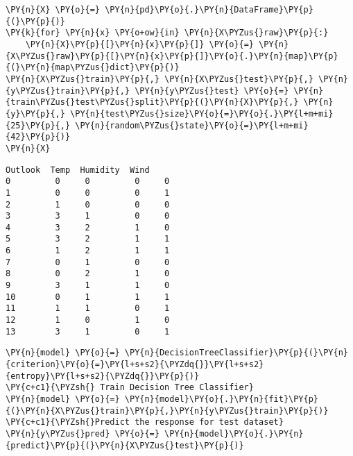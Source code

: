     \begin{tcolorbox}[breakable, size=fbox, boxrule=1pt, pad at break*=1mm,colback=cellbackground, colframe=cellborder]
\begin{Verbatim}[commandchars=\\\{\}]
\PY{n}{X} \PY{o}{=} \PY{n}{pd}\PY{o}{.}\PY{n}{DataFrame}\PY{p}{(}\PY{p}{)}
\PY{k}{for} \PY{n}{x} \PY{o+ow}{in} \PY{n}{X\PYZus{}raw}\PY{p}{:}
    \PY{n}{X}\PY{p}{[}\PY{n}{x}\PY{p}{]} \PY{o}{=} \PY{n}{X\PYZus{}raw}\PY{p}{[}\PY{n}{x}\PY{p}{]}\PY{o}{.}\PY{n}{map}\PY{p}{(}\PY{n}{map\PYZus{}dict}\PY{p}{)}
\PY{n}{X\PYZus{}train}\PY{p}{,} \PY{n}{X\PYZus{}test}\PY{p}{,} \PY{n}{y\PYZus{}train}\PY{p}{,} \PY{n}{y\PYZus{}test} \PY{o}{=} \PY{n}{train\PYZus{}test\PYZus{}split}\PY{p}{(}\PY{n}{X}\PY{p}{,} \PY{n}{y}\PY{p}{,} \PY{n}{test\PYZus{}size}\PY{o}{=}\PY{o}{.}\PY{l+m+mi}{25}\PY{p}{,} \PY{n}{random\PYZus{}state}\PY{o}{=}\PY{l+m+mi}{42}\PY{p}{)} 
\PY{n}{X}
\end{Verbatim}
\end{tcolorbox}

            \begin{tcolorbox}[breakable, size=fbox, boxrule=.5pt, pad at break*=1mm, opacityfill=0]
\begin{Verbatim}[commandchars=\\\{\}]
    Outlook  Temp  Humidity  Wind
0         0     0         0     0
1         0     0         0     1
2         1     0         0     0
3         3     1         0     0
4         3     2         1     0
5         3     2         1     1
6         1     2         1     1
7         0     1         0     0
8         0     2         1     0
9         3     1         1     0
10        0     1         1     1
11        1     1         0     1
12        1     0         1     0
13        3     1         0     1
\end{Verbatim}
\end{tcolorbox}
        
    \begin{tcolorbox}[breakable, size=fbox, boxrule=1pt, pad at break*=1mm,colback=cellbackground, colframe=cellborder]
\begin{Verbatim}[commandchars=\\\{\}]
\PY{n}{model} \PY{o}{=} \PY{n}{DecisionTreeClassifier}\PY{p}{(}\PY{n}{criterion}\PY{o}{=}\PY{l+s+s2}{\PYZdq{}}\PY{l+s+s2}{entropy}\PY{l+s+s2}{\PYZdq{}}\PY{p}{)}
\PY{c+c1}{\PYZsh{} Train Decision Tree Classifier}
\PY{n}{model} \PY{o}{=} \PY{n}{model}\PY{o}{.}\PY{n}{fit}\PY{p}{(}\PY{n}{X\PYZus{}train}\PY{p}{,}\PY{n}{y\PYZus{}train}\PY{p}{)}
\PY{c+c1}{\PYZsh{}Predict the response for test dataset}
\PY{n}{y\PYZus{}pred} \PY{o}{=} \PY{n}{model}\PY{o}{.}\PY{n}{predict}\PY{p}{(}\PY{n}{X\PYZus{}test}\PY{p}{)}
\end{Verbatim}
\end{tcolorbox}

